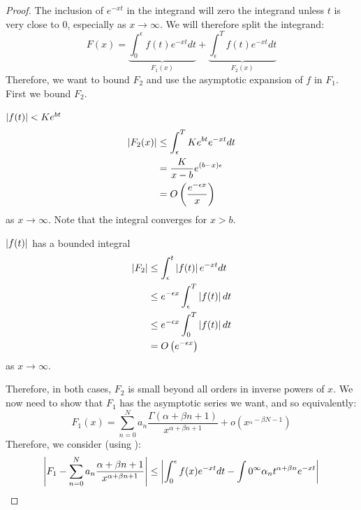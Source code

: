 \documentclass[../Main.tex]{subfiles}
\begin{document}
\begin{proof}
    The inclusion of $e^{-xt}$ in the integrand will zero the integrand unless $t$ is very close to $0$, especially as $x \to \infty$. We will therefore split the integrand:
    \begin{equation*}
        F(x) = \underbrace{\int_{0}^{\epsilon} f(t)e^{-xt} dt}_{F_1(x)} + \underbrace{\int_{\epsilon}^{T} f(t) e^{-xt} dt}_{F_2(x)}
    \end{equation*}
    Therefore, we want to bound $F_2$ and use the asymptotic expansion of $f$ in $F_1$. First we bound $F_2$.
    \begin{case}{$\left|f(t)\right| < Ke^{bt}$}
        \begin{align*}
            \left|F_2(x)\right| &\leq \int_{\epsilon}^{T} Ke^{bt} e^{-xt} dt  \\
            &= \frac{K}{x-b} e^{(b-x)\epsilon} \\
            &= O\left(\frac{e^{-\epsilon x}}{x}\right)
        \end{align*}
        as $x \to \infty$. Note that the integral converges for $x > b$.
    \end{case}
    \begin{case}{$\left|f(t)\right|$ has a bounded integral}
        \begin{align*}
            \left|F_2\right|&\leq \int_{\epsilon}^{t} \left|f(t)\right| e^{-xt} dt \\
            &\leq e^{-\epsilon x} \int_{\epsilon}^{T} \left|f(t)\right| dt \\
            &\leq e^{-\epsilon x} \int_{0}^{T} \left|f(t)\right| dt \\
            &= O\left(e^{-\epsilon x}\right)
        \end{align*}
        as $x \to \infty$.
    \end{case}
    Therefore, in both cases, $F_2$ is small beyond all orders in inverse powers of $x$. We now need to show that $F_1$ has the asymptotic series we want, and so equivalently:
    \begin{equation*}
        F_1(x) = \sum_{n=0}^{N} a_n \frac{\Gamma(\alpha + \beta n + 1)}{x^{\alpha + \beta n + 1}} + o(x^{_\alpha - \beta N - 1})
        \tag{RTP}
    \end{equation*}
    Therefore, we consider (using ):
    \begin{align*}
        \abs{F_1 - \sum_{n=0}^{N} a_n \frac{\alpha + \beta n + 1}{x^{\alpha + \beta n + 1}}} &\leq \abs{\int_0^\epsilon f(x) e^{-xt} dt - \int{0}^{\infty} \alpha_n t^{\alpha + \beta n} e^{-xt}} \\

\end{align*}
\end{proof}
\end{document}

